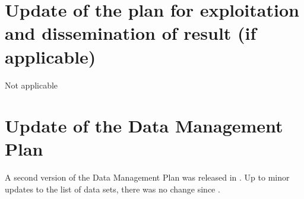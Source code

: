 
\section{Update of the plan for exploitation and dissemination of result (if
    applicable)}
 Not applicable

\section{Update of the Data Management Plan}


A second version of the Data Management Plan was released in
. Up to minor updates to the list
of data sets, there was no change since
.
